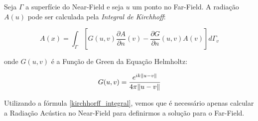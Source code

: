 Seja $\Gamma$ a superfície do Near-Field e seja $u$ um ponto no Far-Field. A radiação $A(u)$ pode ser calculada pela \emph{Integral de Kirchhoff}:

\begin{equation}
	A(x) = \int_{\Gamma} \left[G(u, v)\frac{\partial A}{\partial n}(v) - \frac{\partial G}{\partial n}(u, v)A(v) \right] d\Gamma_v
	\label{kirchhorff_integral}
\end{equation}

onde $G(u, v)$ é a Função de Green da Equação Helmholtz:

\begin{equation}
	G(u, v) = \frac{e^{ik\lVert u-v\rVert}}{4\pi \lVert u-v\rVert}
\end{equation}

Utilizando a fórmula \eqref{kirchhorff_integral}, vemos que é necessário apenas calcular a Radiação Acústica no Near-Field para definirmos a solução para o Far-Field.